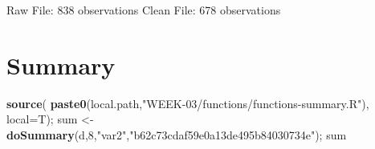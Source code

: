 \documentclass{article}
\newenvironment{Shaded}{\begin{snugshade}}{\end{snugshade}}
\newcommand{\DataTypeTok}[1]{\textcolor[rgb]{0.13,0.29,0.53}{#1}}
\newcommand{\DecValTok}[1]{\textcolor[rgb]{0.00,0.00,0.81}{#1}}
\newcommand{\KeywordTok}[1]{\textcolor[rgb]{0.13,0.29,0.53}{\textbf{#1}}}
\newcommand{\NormalTok}[1]{#1}
\newcommand{\StringTok}[1]{\textcolor[rgb]{0.31,0.60,0.02}{#1}}
\begin{document}
Raw File: 838 observations Clean File: 678 observations

\hypertarget{summary}{%
\section{Summary}\label{summary}}

\begin{Shaded}
\begin{Highlighting}[]
\KeywordTok{source}\NormalTok{( }\KeywordTok{paste0}\NormalTok{(local.path,}\StringTok{"WEEK{-}03/functions/functions{-}summary.R"}\NormalTok{), }\DataTypeTok{local=}\NormalTok{T);}
\NormalTok{sum \textless{}{-}}\StringTok{ }\KeywordTok{doSummary}\NormalTok{(d,}\DecValTok{8}\NormalTok{,}\StringTok{"var2"}\NormalTok{,}\StringTok{"b62c73cdaf59e0a13de495b84030734e"}\NormalTok{);}
\NormalTok{sum}
\end{Highlighting}
\end{Shaded}
\end{document}
